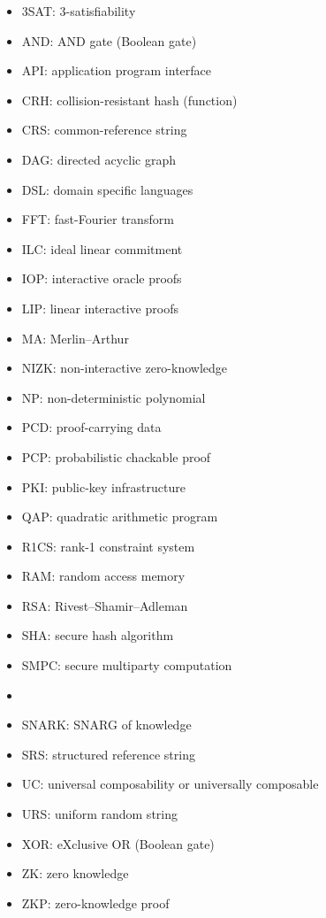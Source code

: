 \begin{multicols}{2}
\begin{itemize}
\item 3SAT: 3-satisfiability
\item AND: AND gate (Boolean gate)
\item API: application program interface
\item CRH: collision-resistant hash (function)
\item CRS: common-reference string
\item DAG: directed acyclic graph
\item DSL: domain specific languages
\item FFT: fast-Fourier transform
\item ILC: ideal linear commitment
\item IOP: interactive oracle proofs
\item LIP: linear interactive proofs
\item MA: Merlin--Arthur
\item NIZK: non-interactive zero-knowledge
\item NP: non-deterministic polynomial
\item PCD: proof-carrying data
\item PCP: probabilistic chackable proof
\item PKI: public-key infrastructure
\item QAP: quadratic arithmetic program
\item R1CS: rank-1 constraint system
\item RAM: random access memory 
\item RSA: Rivest--Shamir--Adleman
\item SHA: secure hash algorithm
\item SMPC: secure multiparty computation
\item {}
\item SNARK: SNARG of knowledge
\item SRS: structured reference string
\item UC: universal composability or universally composable
\item URS: uniform random string
\item XOR: eXclusive OR (Boolean gate)
\item ZK: zero knowledge
\item ZKP: zero-knowledge proof
\end{itemize}
\end{multicols}



